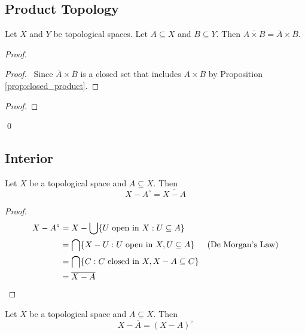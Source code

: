 \subsection{Product Topology}

\begin{prop}
Let $X$ and $Y$ be topological spaces. Let $A \subseteq X$ and $B \subseteq Y$. Then $\overline{A \times B} = \overline{A} \times \overline{B}$.
\end{prop}

\begin{proof}
\pf
{}
\begin{proof}
	\pf\ Since $\overline{A} \times \overline{B}$ is a closed set that includes $A \times B$ by Proposition \ref{prop:closed_product}.
\end{proof}
\begin{proof}
\end{proof}
\qed
\end{proof}

\subsection{Interior}

\begin{prop}
Let $X$ be a topological space and $A \subseteq X$. Then
\[ X - A^\circ = \overline{X - A} \]
\end{prop}

\begin{proof}
\pf
\begin{align*}
X - A^\circ & = X - \bigcup \{ U \text{ open in } X : U \subseteq A \} \\
& = \bigcap \{ X - U : U \text{ open in } X, U \subseteq A \} & (\text{De Morgan's Law}) \\
& = \bigcap \{ C : C \text{ closed in } X, X - A \subseteq C \} \\
& = \overline{X-A} & \qed
\end{align*}
\end{proof}

\begin{prop}
Let $X$ be a topological space and $A \subseteq X$. Then
\[ X - \overline{A} = (X - A)^\circ \]
\end{prop}

